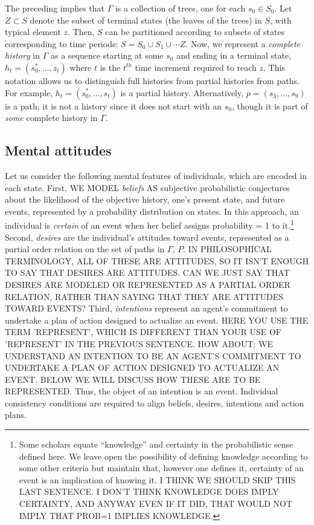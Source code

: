 \documentclass[
11pt,
titlepage,
reqno,
]{article}%
\theoremstyle{definition}
\begin{document}
	The preceding implies that  $\Gamma$ is a collection of trees, one for each $s_0\in S_0$. 
	Let $Z\subset S$ denote the subset of terminal states (the leaves of the trees) in $S$, with typical element $z$.
	Then, $S$ can be partitioned according to  subsets of states corresponding to time periods: $S=S_0\cup S_1\cup \cdots Z$.
	Now, we represent a \textit{complete history} in $\Gamma$ as a sequence starting at some $s_0$ and ending in a terminal state,  $h_t=(s_0^\ast,\ldots,z_t)$ where $t$ is the $t^{th}$ time increment required to reach $z$. 
	This notation allows us to distinguish full histories from partial histories from paths. 
	For example, $h_t=(s_0^\ast,\ldots,s_t)$ is a partial history.
	Alternatively,  $p=(s_3,\ldots,s_9)$ is a path; it is not a history since it does not start with an $s_0$, though it is  part of \textit{some} complete history in $\Gamma$.
	
	
	
	\subsection{Mental attitudes\label{sec:attitudes}}
	Let us consider the following mental features of individuals, which are encoded in each state. 
	First, WE MODEL \textit{beliefs} AS subjective probabilistic conjectures about the likelihood of the objective history, one's present state, and future events, represented by a probability distribution on states. 
	In this approach, an individual is \textit{certain} of an event when her belief assigns probability = 1 to it.\footnote
	{
		Some scholars equate ``knowledge'' and certainty in the probabilistic sense defined here. 
		We leave open the possibility of defining knowledge according to some other criteria but maintain that, however one defines it, certainty of an event is an implication of knowing it. 
		I THINK WE SHOULD SKIP THIS LAST SENTENCE. I DON'T THINK KNOWLEDGE DOES IMPLY CERTAINTY, AND ANYWAY EVEN IF IT DID, THAT WOULD NOT IMPLY THAT PROB=1 IMPLIES KNOWLEDGE.
	} 
	Second, \textit{desires} are the individual's attitudes toward events, represented as a partial order relation on the set of paths in $\Gamma$, $P$. 
	IN PHILOSOPHICAL TERMINOLOGY, ALL OF THESE ARE ATTITUDES, SO IT ISN'T ENOUGH TO SAY THAT DESIRES ARE ATTITUDES. CAN WE JUST SAY THAT DESIRES ARE MODELED OR REPRESENTED AS A PARTIAL ORDER RELATION, RATHER THAN SAYING THAT THEY ARE ATTITUDES TOWARD EVENTS? 
	Third, \textit{intentions} represent an agent's commitment to undertake a plan of action designed to actualize an event. 
	HERE YOU USE THE TERM 'REPRESENT', WHICH IS DIFFERENT THAN YOUR USE OF 'REPRESENT' IN THE PREVIOUS SENTENCE. HOW ABOUT: WE UNDERSTAND AN INTENTION TO BE AN AGENT'S COMMITMENT TO UNDERTAKE A PLAN OF ACTION DESIGNED TO ACTUALIZE AN EVENT. BELOW WE WILL DISCUSS HOW THESE ARE TO BE REPRESENTED. 
	Thus, the object of an intention is an event. Individual consistency conditions are required to align beliefs, desires, intentions and action plans. 
	
\end{document}
